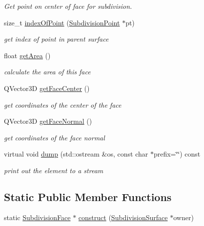 \begin{DoxyCompactItemize}
\begin{DoxyCompactList}\small\item\em Get point on center of face for subdivision. \end{DoxyCompactList}\item 
size\-\_\-t \hyperlink{classShipCAD_1_1SubdivisionFace_a8b32525b95c836e065cb124a61caec61}{index\-Of\-Point} (\hyperlink{classShipCAD_1_1SubdivisionPoint}{Subdivision\-Point} $\ast$pt)
\begin{DoxyCompactList}\small\item\em get index of point in parent surface \end{DoxyCompactList}\item 
float \hyperlink{classShipCAD_1_1SubdivisionFace_ace99f0fe3b54e57912e5391e0aff84ea}{get\-Area} ()
\begin{DoxyCompactList}\small\item\em calculate the area of this face \end{DoxyCompactList}\item 
Q\-Vector3\-D \hyperlink{classShipCAD_1_1SubdivisionFace_a3574fd6a4241a81faa7f2ff741d07811}{get\-Face\-Center} ()
\begin{DoxyCompactList}\small\item\em get coordinates of the center of the face \end{DoxyCompactList}\item 
Q\-Vector3\-D \hyperlink{classShipCAD_1_1SubdivisionFace_add361089333f9d08a411d16ea1782246}{get\-Face\-Normal} ()
\begin{DoxyCompactList}\small\item\em get coordinates of the face normal \end{DoxyCompactList}\item 
virtual void \hyperlink{classShipCAD_1_1SubdivisionFace_aa5bd261ae5fc0a1c7fe8cc5328b8477f}{dump} (std\-::ostream \&os, const char $\ast$prefix=\char`\"{}\char`\"{}) const 
\begin{DoxyCompactList}\small\item\em print out the element to a stream \end{DoxyCompactList}\end{DoxyCompactItemize}
\subsection*{Static Public Member Functions}
\begin{DoxyCompactItemize}
\item 
static \hyperlink{classShipCAD_1_1SubdivisionFace}{Subdivision\-Face} $\ast$ \hyperlink{classShipCAD_1_1SubdivisionFace_a4a6f182fa7e5cf63fc95c7614805f136}{construct} (\hyperlink{classShipCAD_1_1SubdivisionSurface}{Subdivision\-Surface} $\ast$owner)
\end{DoxyCompactItemize}
